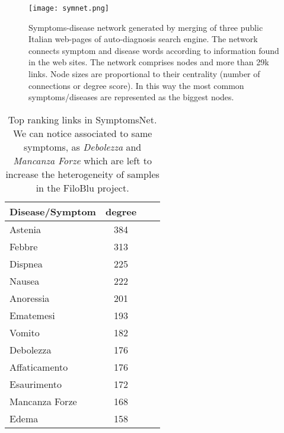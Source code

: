 \documentclass{standalone}
\begin{document}
\begin{figure}[htbp]
\centering
\texttt{[image: symnet.png]}
\caption{Symptoms-disease network generated by merging of three public Italian web-pages of auto-diagnosis search engine.
The network connects symptom and disease words according to information found in the web sites.
The network comprises  nodes and more than 29k links.
Node sizes are proportional to their centrality (number of connections or degree score).
In this way the most common symptoms/diseases are represented as the biggest nodes.
}
\label{fig:net}
\end{figure}

\begin{table}[htbp]
\centering
\begin{tabular}{lccc}
\hline \rowcolor{darkgrayrow}
Disease/Symptom & degree \\
\hline
Astenia         & 384    \\
Febbre          & 313    \\
Dispnea         & 225    \\
Nausea          & 222    \\
Anoressia       & 201    \\
Ematemesi       & 193    \\
Vomito          & 182    \\
Debolezza       & 176    \\
Affaticamento   & 176    \\
Esaurimento     & 172    \\
Mancanza Forze  & 168    \\
Edema           & 158    \\
\hline
\end{tabular}
\caption{Top ranking links in \textsf{SymptomsNet}.
We can notice  associated to same symptoms, as \emph{Debolezza} and \emph{Mancanza Forze} which are left to increase the heterogeneity of samples in the FiloBlu project.}
\label{tab:rank}
\end{table}
\end{document}
